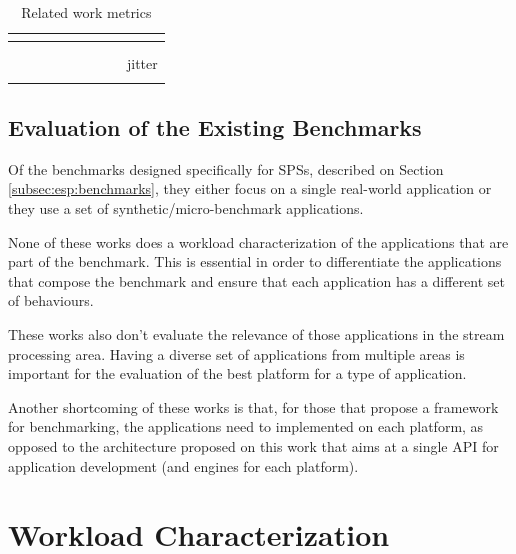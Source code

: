 \documentclass[ppgc,diss,english]{iiufrgs}
\begin{document}
\begin{table}[t]
\begin{center}
\begin{tabular}{ | l | c | c | c | >{\centering\arraybackslash}p{0.5cm} | c | >{\centering\arraybackslash}p{0.7cm} | >{\centering\arraybackslash}p{0.7cm} | >{\centering\arraybackslash}p{1.5cm} |}
		\cite{yahoo2015bench} &  & \textbullet & \textbullet & & & & & \\\hline
		\cite{wang2014bigdatabench} &  &  & \textbullet & & & & & \\\hline
		\cite{wang2016stream} &  & \textbullet & \textbullet & & & & & \\\hline
		\cite{shukla2017riotbench} &  & \textbullet & \textbullet & & & \textbullet & & jitter\\\hline
		\cite{huang2010hibench} &  &  & \textbullet & & \textbullet & \textbullet & & \\\hline
		
	\end{tabular}
	\vspace{5px}
	\caption{Related work metrics}
	\label{table:related_work_metrics}
\end{center}
\end{table}

\subsection{Evaluation of the Existing Benchmarks}
\label{subsec:esp:evaluation_existing_benchmarks}

Of the benchmarks designed specifically for SPSs, described on Section \ref{subsec:esp:benchmarks}, they either focus on a single real-world application or they use a set of synthetic/micro-benchmark applications.

None of these works does a workload characterization of the applications that are part of the benchmark. This is essential in order to differentiate the applications that compose the benchmark and ensure that each application has a different set of behaviours.

These works also don't evaluate the relevance of those applications in the stream processing area. Having a diverse set of applications from multiple areas is important for the evaluation of the best platform for a type of application.

Another shortcoming of these works is that, for those that propose a framework for benchmarking, the applications need to implemented on each platform, as opposed to the architecture proposed on this work that aims at a single API for application development (and engines for each platform).

\section{Workload Characterization}
\label{sec:esp:workload_characterization}
\end{document}
